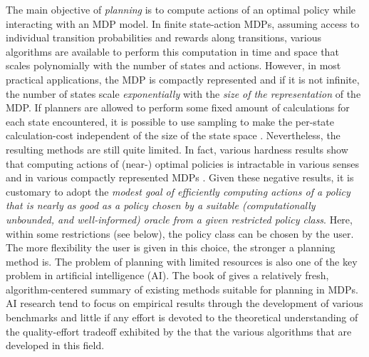 \documentclass[12pt,draftcls,onecolumn]{IEEEtran}
\begin{document}
The main objective of \emph{planning} is to compute actions of an optimal policy while interacting with an MDP model.
In finite state-action MDPs,
assuming access to individual transition probabilities and rewards along transitions,
various algorithms are available to perform this computation in time and space that scales polynomially with the number of states and actions.
However, in most practical applications, the MDP is compactly represented
and if it is not infinite, the number of states scale \emph{exponentially} with the \emph{size of the representation} of the MDP.
If planners are allowed to perform some fixed amount of calculations for each state encountered,
it is possible to use sampling to make the per-state calculation-cost
independent of the size of the state space \cite{rust96:randomization,szepesvari2001,kearns2002sparse}.
Nevertheless, the resulting methods are still quite limited.
In fact, various hardness results show that computing actions of (near-) optimal policies is intractable in various senses
and in various compactly represented MDPs \cite{BlonTsi:00Complexity}.
Given these negative results,
it is customary to adopt the \emph{modest goal of efficiently computing actions of a policy that
is nearly as good as a policy chosen by a suitable (computationally unbounded, and well-informed) oracle
from a given restricted policy class}. 
Here, within some restrictions (see below), the policy class can be chosen by the user.
The more flexibility the user is given in this choice, the stronger a planning method is. 
The problem of planning with limited resources is also one of the key problem in
artificial intelligence (AI). 
The book of  \cite{kolobov2012planning} gives a relatively fresh, algorithm-centered 
summary of existing methods suitable for planning in MDPs. 
AI research tend to focus on empirical results through the development of various benchmarks
and little if any effort is devoted to the theoretical understanding of the quality-effort tradeoff exhibited by the
that the various algorithms that are developed in this field.
\end{document}
